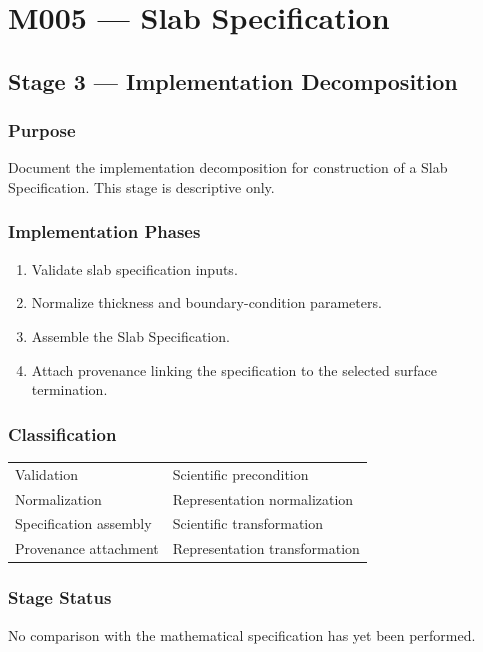 \chapter{M005 --- Slab Specification}

\section{Stage 3 --- Implementation Decomposition}

\subsection{Purpose}

Document the implementation decomposition for construction of a Slab
Specification. This stage is descriptive only.

\subsection{Implementation Phases}

\begin{enumerate}
\item Validate slab specification inputs.
\item Normalize thickness and boundary-condition parameters.
\item Assemble the Slab Specification.
\item Attach provenance linking the specification to the selected
surface termination.
\end{enumerate}

\subsection{Classification}

\begin{tabular}{ll}
Validation & Scientific precondition\\
Normalization & Representation normalization\\
Specification assembly & Scientific transformation\\
Provenance attachment & Representation transformation\\
\end{tabular}

\subsection{Stage Status}

No comparison with the mathematical specification has yet been
performed.
